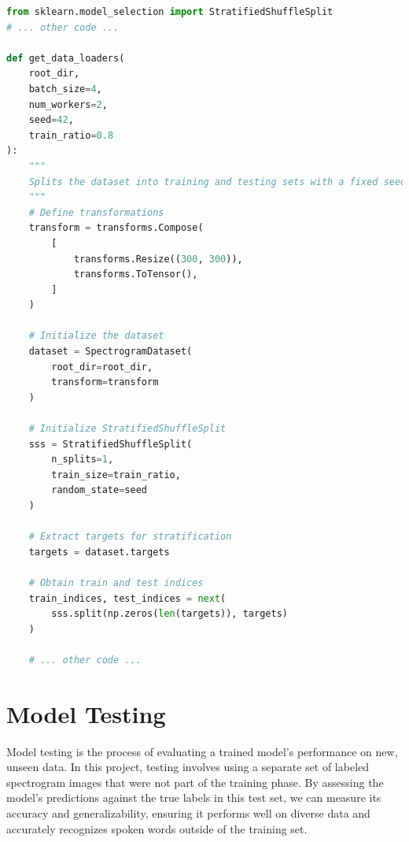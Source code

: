 \documentclass[12pt]{article}
\begin{document}
\newpage

\begin{lstlisting}[language=Python, caption=Dataset Preparation and Splitting, label={lst:main_training_function}]
from sklearn.model_selection import StratifiedShuffleSplit
# ... other code ...

def get_data_loaders(
    root_dir,
    batch_size=4,
    num_workers=2,
    seed=42,
    train_ratio=0.8
):
    """
    Splits the dataset into training and testing sets with a fixed seed and ensures that each class is equally represented in both sets (stratified split).
    """
    # Define transformations
    transform = transforms.Compose(
        [
            transforms.Resize((300, 300)),
            transforms.ToTensor(),
        ]
    )

    # Initialize the dataset
    dataset = SpectrogramDataset(
        root_dir=root_dir,
        transform=transform
    )

    # Initialize StratifiedShuffleSplit
    sss = StratifiedShuffleSplit(
        n_splits=1,
        train_size=train_ratio,
        random_state=seed
    )

    # Extract targets for stratification
    targets = dataset.targets

    # Obtain train and test indices
    train_indices, test_indices = next(
        sss.split(np.zeros(len(targets)), targets)
    )

    # ... other code ...
\end{lstlisting}




\newpage




\section{Model Testing}

Model testing is the process of evaluating a trained model's performance on new, unseen data. In this project, testing involves using a separate set of labeled spectrogram images that were not part of the training phase. By assessing the model’s predictions against the true labels in this test set, we can measure its accuracy and generalizability, ensuring it performs well on diverse data and accurately recognizes spoken words outside of the training set.



\end{document}
